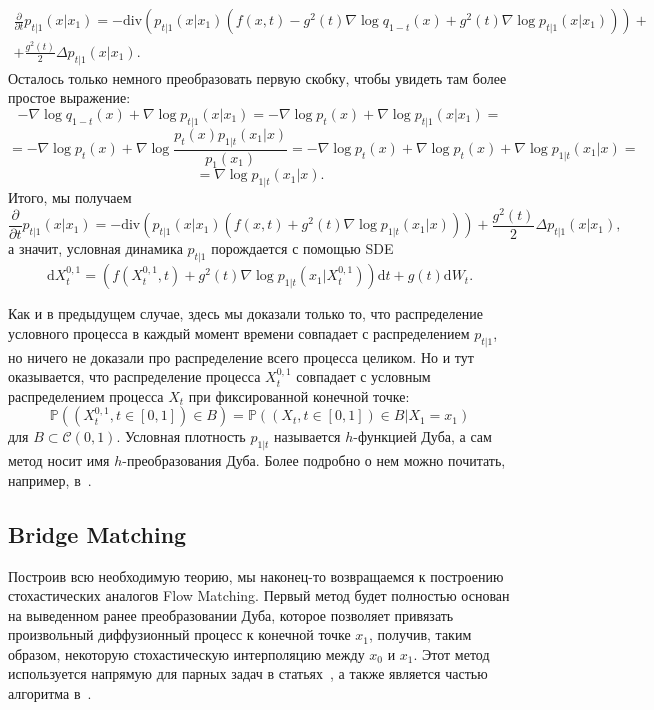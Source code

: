 \documentclass[12pt]{article}
\theoremstyle{definition}
\begin{document}
\begin{multline*}
    \frac{\partial}{\partial t} p_{t | 1}(x | x_1) = -\text{div}\left(p_{t | 1}(x | x_1) \left(f(x, t) - g^2(t)\nabla \log q_{1 - t}(x) + g^2(t) \nabla \log p_{t | 1}(x | x_1)\right)\right) + \\
    + \frac{g^2(t)}{2} \Delta p_{t | 1}(x | x_1).
\end{multline*}
Осталось только немного преобразовать первую скобку, чтобы увидеть там более простое выражение:
\[
    -\nabla \log q_{1-t}(x) + \nabla \log p_{t | 1}(x | x_1) = -\nabla \log p_{t}(x) + \nabla \log p_{t | 1}(x | x_1) =
\]
\[
    = -\nabla \log p_t(x) + \nabla \log \frac{p_t(x) p_{1 | t}(x_1 | x)}{p_1(x_1)} = -\nabla \log p_t(x) + \nabla \log p_t(x) + \nabla \log p_{1 | t}(x_1 | x) =
\]
\[
    = \nabla \log p_{1 | t}(x_1 | x).
\]
Итого, мы получаем
\[
    \frac{\partial}{\partial t} p_{t | 1}(x | x_1) = -\text{div}\left(p_{t | 1}(x | x_1)\left(f(x, t) + g^2(t) \nabla \log p_{1 | t}(x_1 | x) \right)\right) + \frac{g^2(t)}{2} \Delta p_{t | 1}(x | x_1),
\]
а значит, условная динамика $p_{t | 1}$ порождается с помощью SDE
\[
    \mathrm{d} X^{0, 1}_t = \left(f(X^{0, 1}_t, t) + g^2(t) \nabla \log p_{1 | t}(x_1 | X^{0, 1}_t) \right)\mathrm{d} t + g(t) \mathrm{d} W_t.
\]

Как и в предыдущем случае, здесь мы доказали только то, что распределение условного процесса в каждый момент времени совпадает с распределением $p_{t | 1}$, но ничего не доказали про распределение всего процесса целиком. Но и тут оказывается, что распределение процесса $X^{0, 1}_t$ совпадает с условным распределением процесса $X_t$ при фиксированной конечной точке:
\[
    \mathbb{P}((X_t^{0, 1}, t \in [0, 1]) \in B) = \mathbb{P}((X_t, t \in [0, 1]) \in B | X_1 = x_1)
\]
для $B \subset \mathcal{C}(0, 1)$. Условная плотность $p_{1 | t}$ называется $h$-функцией Дуба, а сам метод носит имя $h$-преобразования Дуба. Более подробно о нем можно почитать, например, в~\cite{rogers2000diffusions}.

\subsection{Bridge Matching}
Построив всю необходимую теорию, мы наконец-то возвращаемся к построению стохастических аналогов Flow Matching. Первый метод будет полностью основан на выведенном ранее преобразовании Дуба, которое позволяет привязать произвольный диффузионный процесс к конечной точке $x_1$, получив, таким образом, некоторую стохастическую интерполяцию между $x_0$ и $x_1$. Этот метод используется напрямую для парных задач в статьях~\cite{somnath2023aligned, liu20232}, а также является частью алгоритма в~\cite{shi2023diffusion}.
\end{document}

